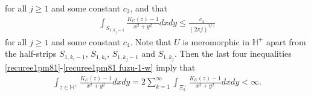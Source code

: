 \documentclass[12pt]{amsart}
\numberwithin{equation}{section}
\begin{document}
for all $j\geq 1$ and some constant $c_3$, and that
\begin{equation}\label{recuree1pm81 fuzu-1-w}
\begin{split}
\int_{S_{1,k_j-1}}\frac{K_U(z)-1}{x^2+y^2}dxdy\leq \frac{c_4}{(2\pi j)^{1/\gamma}}
\end{split}
\end{equation}
for all $j\geq 1$ and some constant $c_4$. Note that $U$ is meromorphic in $\mathbb{H}^{+}$ apart from the half-strips $S_{1,k_i-1}$, $S_{1,k_i}$, $S_{1,k_j-1}$ and $S_{1,k_j}$. Then the last four inequalities \eqref{recuree1pm81}-\eqref{recuree1pm81 fuzu-1-w} imply that
\begin{equation}\label{recuree1pm81 fuzu-1-w-final}
\begin{split}
\int_{z\in \mathbb{H}^{+}}\frac{K_U(z)-1}{x^2+y^2}dxdy=2\sum_{k=1}^{\infty}\int_{\Xi^{+}_{k}}\frac{K_U(z)-1}{x^2+y^2}dxdy<\infty.
\end{split}
\end{equation}
\end{document}
